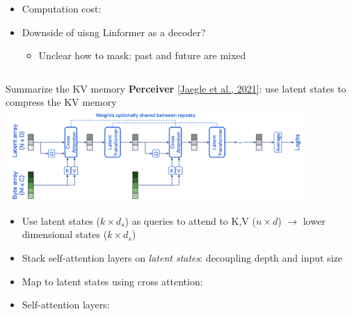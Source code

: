 \documentclass[usenames,dvipsnames,notes,11pt,aspectratio=169,hyperref={colorlinks=true, linkcolor=blue}]{beamer}
\begin{document}
\begin{frame}
\begin{columns}
\begin{column}{0.7\textwidth}
\begin{itemize}[<+->]
\begin{itemize}
                        \item What's the dimension of the attention matrix?
                        \item What's the dimension of the self-attention output?
                    \end{itemize}
                \item Computation cost: 
                \item Downside of uisng Linformer as a decoder?
                    \begin{itemize}
                        \item Unclear how to mask: past and future are mixed
                    \end{itemize}
            \end{itemize}
        \end{column}
    \end{columns}
\end{frame}

\begin{frame}
    {Summarize the KV memory}
    \textbf{Perceiver} \href{https://arxiv.org/pdf/2103.03206.pdf}{[Jaegle et al., 2021]}: use latent states to compress the KV memory \\[1em]

    \includegraphics[height=3.5cm]{figures/perceiver}

    \begin{itemize}[<+->]
        \item Use latent states ($k\times d_s$) as queries to attend to K,V ($n\times d$) $\longrightarrow$ lower dimensional states ($k\times d_s$)
        \item Stack self-attention layers on \textit{latent states}: decoupling depth and input size
        \item Map to latent states using cross attention: 
        \item Self-attention layers: 
    \end{itemize}
\end{frame}

\end{document}
